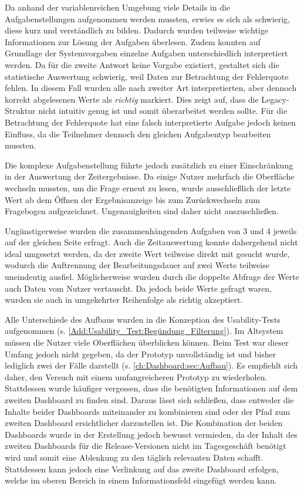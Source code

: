 Da anhand der variablenreichen Umgebung viele Details in die Aufgabenstellungen aufgenommen werden mussten, erwies es sich als schwierig, diese kurz und verständlich zu bilden. Dadurch wurden teilweise wichtige Informationen zur Lösung der Aufgaben überlesen. Zudem konnten auf Grundlage der Systemvorgaben einzelne Aufgaben unterschiedlich interpretiert werden. Da für die zweite Antwort keine Vorgabe existiert, gestaltet sich die statistische Auswertung schwierig, weil Daten zur Betrachtung der Fehlerquote fehlen. In diesem Fall wurden alle nach zweiter Art interpretierten, aber dennoch korrekt abgelesenen Werte als \textit{richtig} markiert. Dies zeigt auf, dass die Legacy-Struktur nicht intuitiv genug ist und somit überarbeitet werden sollte. Für die Betrachtung der Fehlerquote hat eine falsch interpretierte Aufgabe jedoch keinen Einfluss, da die Teilnehmer dennoch den gleichen Aufgabentyp bearbeiten mussten.

Die komplexe Aufgabenstellung führte jedoch zusätzlich zu einer Einschränkung in der Auswertung der Zeitergebnisse.
Da einige Nutzer mehrfach die Oberfläche wechseln mussten, um die Frage erneut zu lesen, wurde ausschließlich der letzte Wert ab dem Öffnen der Ergebnisanzeige bis zum Zurückwechseln zum Fragebogen aufgezeichnet. Ungenauigkeiten sind daher nicht auszuschließen.

Ungünstigerweise wurden die zusammenhängenden Aufgaben von 3 und 4 jeweils auf der gleichen Seite erfragt. Auch die Zeitauswertung konnte dahergehend nicht ideal umgesetzt werden, da der zweite Wert teilweise direkt mit gesucht wurde, wodurch die Auftrennung der Bearbeitungsdauer auf zwei Werte teilweise uneindeutig ausfiel.
Möglicherweise wurden durch die doppelte Abfrage der Werte auch Daten vom Nutzer vertauscht. Da jedoch beide Werte gefragt waren, wurden sie auch in umgekehrter Reihenfolge als richtig akzeptiert.

Alle Unterschiede des Aufbaus wurden in die Konzeption des Usability-Tests aufgenommen (s. \autoref{Add:Usability_Test:Begündung_Filterung}). Im Altsystem müssen die Nutzer viele Oberflächen überblicken können. Beim Test war dieser Umfang jedoch nicht gegeben, da der Prototyp unvollständig ist und bisher lediglich zwei der Fälle darstellt (s. \autoref{ch:Dashboard:sec:Aufbau}). Es empfiehlt sich daher, den Versuch mit einem umfangreicheren Prototyp zu wiederholen.
Stattdessen wurde häufiger vergessen, dass die benötigten Informationen auf dem zweiten Dash\-board zu finden sind. Daraus lässt sich schließen, dass entweder die Inhalte beider Dash\-boards miteinander zu kombinieren sind oder der Pfad zum zweiten Dash\-board ersichtlicher darzustellen ist. Die Kombination der beiden Dash\-boards wurde in der Erstellung jedoch bewusst vermieden, da der Inhalt des zweiten Dash\-boards für die Release-Versionen nicht im Tagesgeschäft benötigt wird und somit eine Ablenkung zu den täglich relevanten Daten schafft. Stattdessen kann jedoch eine Verlinkung auf das zweite Dash\-board erfolgen, welche im oberen Bereich in einem Informationsfeld eingefügt werden kann.

